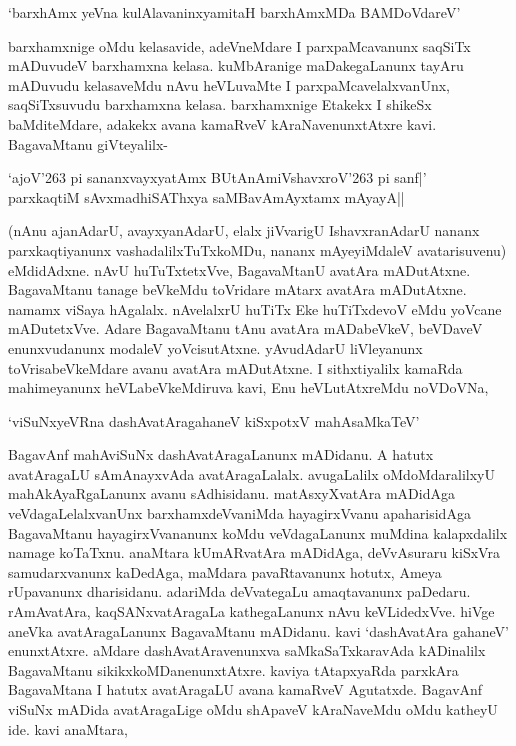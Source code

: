 \begin{shloka}
`barxhAmx yeVna kulAlavaninxyamitaH barxhAmxMDa BAMDoVdareV'
\end{shloka}

barxhamxnige oMdu kelasavide, adeVneMdare I parxpaMcavanunx saqSiTx mADuvudeV barxhamxna kelasa. kuMbAranige maDakegaLanunx tayAru mADuvudu kelasaveMdu nAvu heVLuvaMte I parxpaMcavelalxvanUnx, saqSiTxsuvudu barxhamxna kelasa. barxhamxnige Etakekx I shikeSx baMditeMdare, adakekx avana kamaRveV kAraNavenunxtAtxre kavi. BagavaMtanu giVteyalilx-

\begin{shloka}
`ajoV\char'263 pi sananxvayxyatAmx BUtAnAmiVshavxroV\char'263 pi sanf|'\\
parxkaqtiM sAvxmadhiSAThxya saMBavAmAyxtamx mAyayA||
\end{shloka}

(nAnu ajanAdarU, avayxyanAdarU, elalx jiVvarigU IshavxranAdarU nananx parxkaqtiyanunx vashadalilxTuTxkoMDu, nananx mAyeyiMdaleV avatarisuvenu) eMdidAdxne. nAvU huTuTxtetxVve, BagavaMtanU avatAra mADutAtxne. BagavaMtanu tanage beVkeMdu toVridare mAtarx avatAra mADutAtxne. namamx viSaya hAgalalx. nAvelalxrU huTiTx Eke huTiTxdevoV eMdu yoVcane mADutetxVve. Adare BagavaMtanu tAnu avatAra mADabeVkeV, beVDaveV enunxvudanunx modaleV yoVcisutAtxne. yAvudAdarU liVleyanunx toVrisabeVkeMdare avanu avatAra mADutAtxne. I sithxtiyalilx kamaRda mahimeyanunx heVLabeVkeMdiruva kavi, Enu heVLutAtxreMdu noVDoVNa,

\begin{shloka}
`viSuNxyeVRna dashAvatAragahaneV kiSxpotxV mahAsaMkaTeV'
\end{shloka}

BagavAnf mahAviSuNx dashAvatAragaLanunx mADidanu. A hatutx avatAragaLU sAmAnayxvAda avatAragaLalalx. avugaLalilx oMdoMdaralilxyU mahAkAyaRgaLanunx avanu sAdhisidanu. matAsxyXvatAra mADidAga veVdagaLelalxvanUnx barxhamxdeVvaniMda hayagirxVvanu apaharisidAga BagavaMtanu hayagirxVvananunx koMdu veVdagaLanunx muMdina kalapxdalilx namage koTaTxnu. anaMtara kUmARvatAra mADidAga, deVvAsuraru kiSxVra samudarxvanunx kaDedAga, maMdara pavaRtavanunx hotutx, Ameya rUpavanunx dharisidanu. adariMda deVvategaLu amaqtavanunx paDedaru. rAmAvatAra, kaqSANxvatAragaLa kathegaLanunx nAvu keVLidedxVve. hiVge aneVka avatAragaLanunx BagavaMtanu mADidanu. kavi `dashAvatAra gahaneV' enunxtAtxre. aMdare dashAvatAravenunxva saMkaSaTxkaravAda kADinalilx BagavaMtanu sikikxkoMDanenunxtAtxre. kaviya tAtapxyaRda parxkAra BagavaMtana I hatutx avatAragaLU avana kamaRveV Agutatxde. BagavAnf viSuNx mADida avatAragaLige oMdu shApaveV kAraNaveMdu oMdu katheyU ide. kavi anaMtara,

